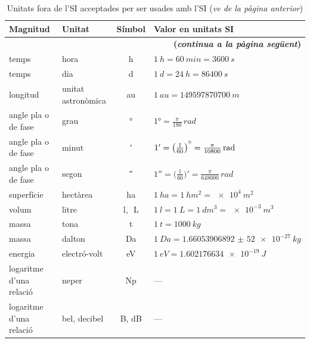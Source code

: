\begin{ThreePartTable}
\begin{longtable}[h]{llcl}
   \caption[]{Unitats fora de l'SI acceptades per ser usades amb l'SI (\emph{ve de la pàgina
   anterior})}\\
   \toprule[1pt]
    Magnitud & Unitat &  Símbol & Valor en unitats SI\\
   \midrule
   \endhead
   \midrule
   \multicolumn{4}{r}{\sffamily\bfseries\color{NavyBlue}(\emph{continua a la pàgina següent})}
   \endfoot
   \insertTableNotes
   \endlastfoot
   temps & minut &  \unit{min}& $\qty{1}{min} = \qty{60}{s}$ \\
   temps & hora & \unit{h} & $\qty{1}{h} = \qty{60}{min} = \qty{3600}{s}$ \\
   temps & dia & \unit{d} & $\qty{1}{d} = \qty{24}{h} = \qty{86400}{s}$\\
   longitud & unitat astronòmica\tnote{\color{blue}(a)} &  \unit{au} &  $\qty{1}{au} =  \qty{149597870700}{m}$ \\
   angle pla o de fase & grau &  \unit{\degree} &   $\ang{1} = \frac{\pi}{180}\unit{\,rad}$ \\[2mm]
   angle pla o de fase & minut & \unit{\arcminute} & $\ang{;1;} = \big(\frac{1}{60}\big)\raisebox{1.5mm}{\unit{\degree}} = \frac{\pi}{10800}\unit{\,rad}$ \\[2mm]
   angle pla  o de fase & segon & \unit{\arcsecond} & $\ang{;;1} = \big(\frac{1}{60}\big)' = \frac{\pi}{648000}\unit{\,rad}$ \\[2mm]
   superfície & hectàrea\tnote{\color{blue}(b)} & \unit{ha} & $\qty{1}{ha} = \qty{1}{hm^2} = \qty[print-unity-mantissa = false]{e4}{m^2}$\\
   volum & litre &  \unit{l},\unit{\,L}\tnote{\color{blue}(c)} & $\qty{1}{l} = \qty{1}{L} = \qty{1}{dm^3} = \qty[print-unity-mantissa = false]{e-3}{m^3}$ \\
   massa & tona\tnote{\color{blue}(d)} & \unit{t} & $\qty{1}{t} = \qty{1000}{kg}$\\
   massa & dalton\tnote{\color{blue}(e)} & Da & $\qty{1}{Da} = \qty{1,660 539 068 92(52)e-27}{kg}$\\
   energia & electró-volt\tnote{\color{blue}(f)} & eV & $\qty{1}{eV} = \qty{1,602176634e-19}{J}$ \\
   logaritme d'una relació & neper\tnote{\color{blue}(g)} & \unit{Np} & ---\\
   logaritme d'una relació & bel, decibel\tnote{\color{blue}(g)} &  \unit{B}, \unit{dB} & ---\\
   \bottomrule[1pt]
\end{longtable}
\end{ThreePartTable}
\index{\unit{\degree}}


